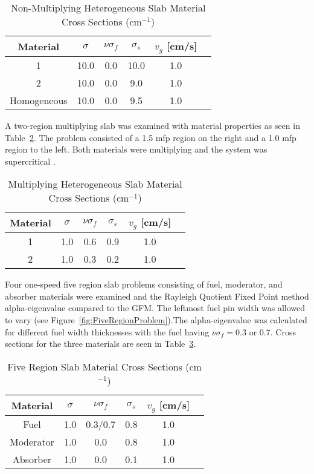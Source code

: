 \begin{table}[H]
    \centering
    \caption{Non-Multiplying Heterogeneous Slab Material Cross Sections (cm$^{-1}$)}
\label{table:BetzlerHetero}
    \begin{tabular}{*6c}
        \toprule
	Material & $\sigma$ & $\nu \sigma_{f}$ & $\sigma_{s}$ & $v_{g}$ [cm/s] \\ 
        \midrule
	1 & 10.0 & 0.0 & 10.0 & 1.0 \\
	2 & 10.0 & 0.0 & 9.0 & 1.0 \\
	Homogeneous & 10.0 & 0.0 & 9.5 & 1.0 \\
        \bottomrule
    \end{tabular}
\end{table}

A two-region multiplying slab was examined with material properties as seen in Table~\ref{table:BetzlerHeteroMult}. The problem consisted of a 1.5 mfp region on the right and a 1.0 mfp region to the left. Both materials were multiplying and the system was supercritical \cite{kornreich_greens_1997}.

\begin{table}[H]
    \centering
    \caption{Multiplying Heterogeneous Slab Material Cross Sections (cm$^{-1}$)}
\label{table:BetzlerHeteroMult}
    \begin{tabular}{*6c}
        \toprule
	Material & $\sigma$ & $\nu \sigma_{f}$ & $\sigma_{s}$ & $v_{g}$ [cm/s] \\ 
        \midrule
	1 & 1.0 & 0.6 & 0.9 & 1.0 \\
	2 & 1.0 & 0.3 & 0.2 & 1.0 \\ 
        \bottomrule
    \end{tabular}
\end{table}

Four one-speed five region slab problems consisting of fuel, moderator, and absorber materials were examined and the Rayleigh Quotient Fixed Point method alpha-eigenvalue compared to the GFM. The leftmost fuel pin width was allowed to vary (see Figure~\ref{fig:FiveRegionProblem}).The alpha-eigenvalue was calculated for different fuel width thicknesses with the fuel having $\nu \sigma_{f} = 0.3$ or $0.7$. Cross sections for the three materials are seen in Table~\ref{table:BetzlerFive}.

\begin{table}[H]
    \centering
    \caption{Five Region Slab Material Cross Sections (cm$^{-1}$)}
\label{table:BetzlerFive}
    \begin{tabular}{*6c}
        \toprule
	Material & $\sigma$ & $\nu \sigma_{f}$ & $\sigma_{s}$ & $v_{g}$ [cm/s] \\ 
        \midrule
	Fuel & 1.0 & 0.3/0.7 & 0.8 & 1.0 \\
	Moderator & 1.0 & 0.0 & 0.8 & 1.0 \\ 
	Absorber & 1.0 & 0.0 & 0.1 & 1.0 \\ 
        \bottomrule
    \end{tabular}
\end{table}

